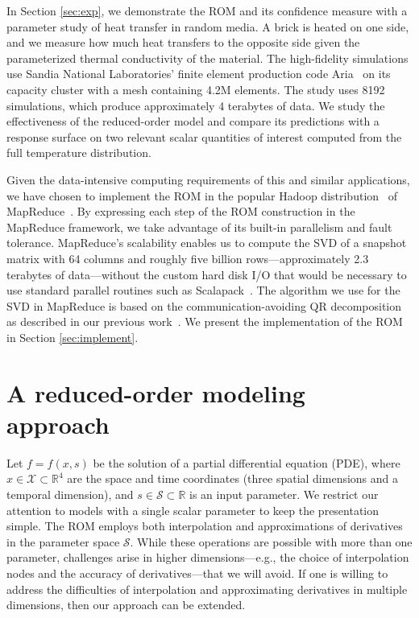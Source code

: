 \documentclass[final]{siamltex}
\begin{document}
In Section \ref{sec:exp}, we demonstrate the ROM and its confidence
measure with a parameter study of heat transfer in random media. A
brick is heated on one side, and we measure how much heat transfers to
the opposite side given the parameterized thermal conductivity of the
material. The high-fidelity simulations use Sandia National
Laboratories' finite element production code Aria~\cite{sand07-2734}
on its capacity cluster with a mesh containing 4.2M elements. The
study uses 8192 simulations, which produce approximately 4 terabytes
of data. We study the effectiveness of the reduced-order model and
compare its predictions with a response surface on two relevant scalar
quantities of interest computed from the full temperature
distribution.

Given the data-intensive computing requirements of this and similar
applications, we have chosen to implement the ROM in the popular
Hadoop distribution~\cite{Hadoop2012-0202-cdh3} of
MapReduce~\cite{Dean2004-MapReduce}. By expressing each step of 
the ROM construction in the MapReduce framework, we take advantage
of its built-in parallelism and fault tolerance. MapReduce's scalability
enables us to compute the SVD of a snapshot matrix with 64 columns and
roughly five billion rows---approximately 2.3 terabytes of data---without
the custom hard disk I/O that would be necessary to use standard
parallel routines such as Scalapack~\cite{blackford1997scalapack}. 
The algorithm we use for the SVD in MapReduce is based on the 
communication-avoiding QR decomposition~\cite{Demmel-2012-CAQR} as
described in our previous work~\cite{Constantine2011}. We present
the implementation of the ROM in Section \ref{sec:implement}. 

\section{A reduced-order modeling approach}
\label{sec:rom}

Let $f=f(x,s)$ be the solution of a partial differential equation
(PDE), where $x\in{\mathcal{X}}\subset\mathbb{R}^4$ are the space and time
coordinates (three spatial dimensions and a temporal dimension), and
$s\in{\mathcal{S}}\subset\mathbb{R}$ is an input parameter.  We restrict our
attention to models with a single scalar parameter to keep the
presentation simple. The ROM employs both interpolation and
approximations of derivatives in the parameter space ${\mathcal{S}}$.  While
these operations are possible with more than one parameter, challenges
arise in higher dimensions---e.g., the choice of interpolation nodes
and the accuracy of derivatives---that we will avoid. If one is
willing to address the difficulties of interpolation and approximating
derivatives in multiple dimensions, then our approach can be extended.
\end{document}

